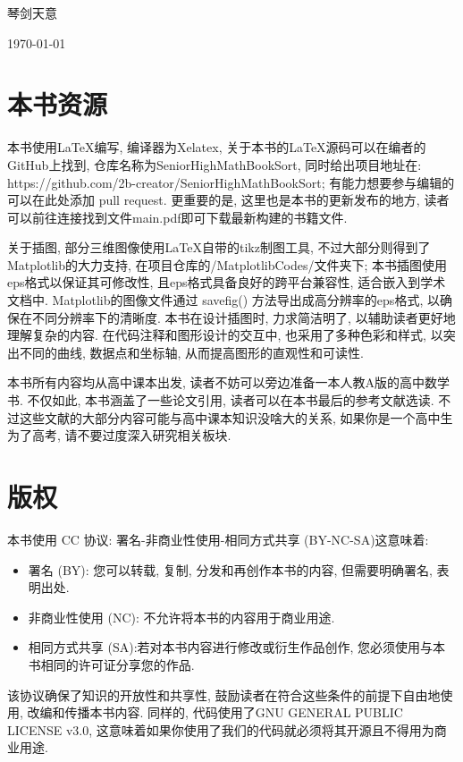 \documentclass{book}
\begin{document}
    {\hfill 琴剑天意}

    {\hfill \today}

    \section{本书资源}
    本书使用\LaTeX 编写, 编译器为Xelatex, 关于本书的\LaTeX 源码可以在编者的GitHub上找到, 仓库名称为SeniorHighMathBookSort, 同时给出项目地址在: \\https://github.com/2b-creator/SeniorHighMathBookSort; 有能力想要参与编辑的可以在此处添加 pull request. 更重要的是, 这里也是本书的更新发布的地方, 读者可以前往连接找到文件main.pdf即可下载最新构建的书籍文件.

    关于插图, 部分三维图像使用\LaTeX 自带的tikz制图工具, 不过大部分则得到了Matplotlib的大力支持, 在项目仓库的/MatplotlibCodes/文件夹下; 本书插图使用eps格式以保证其可修改性, 且eps格式具备良好的跨平台兼容性, 适合嵌入到学术文档中. Matplotlib的图像文件通过 savefig() 方法导出成高分辨率的eps格式, 以确保在不同分辨率下的清晰度. 本书在设计插图时, 力求简洁明了, 以辅助读者更好地理解复杂的内容. 在代码注释和图形设计的交互中, 也采用了多种色彩和样式, 以突出不同的曲线, 数据点和坐标轴, 从而提高图形的直观性和可读性. 

    本书所有内容均从高中课本出发, 读者不妨可以旁边准备一本人教A版的高中数学书. 不仅如此, 本书涵盖了一些论文引用, 读者可以在本书最后的参考文献选读. 不过这些文献的大部分内容可能与高中课本知识没啥大的关系, 如果你是一个高中生为了高考, 请不要过度深入研究相关板块.
    \section{版权}
    本书使用 CC 协议: 署名-非商业性使用-相同方式共享 (BY-NC-SA)\cite{cccommons}这意味着:
    \begin{itemize}
        \item 署名 (BY): 您可以转载, 复制, 分发和再创作本书的内容, 但需要明确署名, 表明出处. 
        \item 非商业性使用 (NC): 不允许将本书的内容用于商业用途. 
        \item 相同方式共享 (SA):若对本书内容进行修改或衍生作品创作, 您必须使用与本书相同的许可证分享您的作品. 
    \end{itemize}

    该协议确保了知识的开放性和共享性, 鼓励读者在符合这些条件的前提下自由地使用, 改编和传播本书内容. 同样的, 代码使用了GNU GENERAL PUBLIC LICENSE v3.0, 这意味着如果你使用了我们的代码就必须将其开源且不得用为商业用途.
\end{document}

